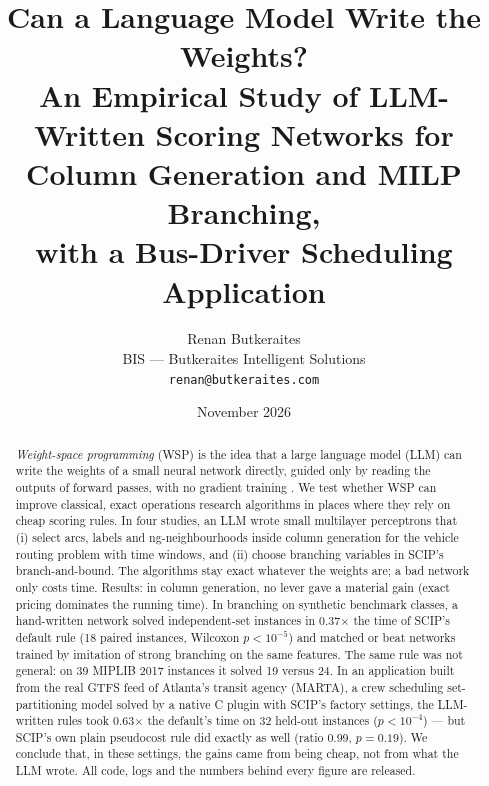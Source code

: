 \documentclass[11pt]{article}
\title{Can a Language Model Write the Weights?\\
\large An Empirical Study of LLM-Written Scoring Networks for Column Generation and MILP Branching,\\
with a Bus-Driver Scheduling Application}
\author{Renan Butkeraites\\
BIS --- Butkeraites Intelligent Solutions\\
\texttt{renan@butkeraites.com}}
\date{November 2026}
\begin{document}
\maketitle

\begin{abstract}
\emph{Weight-space programming} (WSP) is the idea that a large language model (LLM) can write the
weights of a small neural network directly, guided only by reading the outputs of forward passes,
with no gradient training \citep{wsp}. We test whether WSP can improve classical, exact operations
research algorithms in places where they rely on cheap scoring rules. In four studies, an LLM wrote
small multilayer perceptrons that (i) select arcs, labels and ng-neighbourhoods inside column
generation for the vehicle routing problem with time windows, and (ii) choose branching variables
in SCIP's branch-and-bound. The algorithms stay exact whatever the weights are; a bad network only
costs time. Results: in column generation, no lever gave a material gain (exact pricing dominates
the running time). In branching on synthetic benchmark classes, a hand-written network solved
independent-set instances in 0.37$\times$ the time of SCIP's default rule (18 paired instances,
Wilcoxon $p<10^{-5}$) and matched or beat networks trained by imitation of strong branching on the
same features. The same rule was not general: on 39 MIPLIB 2017 instances it solved 19 versus 24.
In an application built from the real GTFS feed of Atlanta's transit agency (MARTA), a crew
scheduling set-partitioning model solved by a native C plugin with SCIP's factory settings, the
LLM-written rules took 0.63$\times$ the default's time on 32 held-out instances ($p<10^{-4}$) ---
but SCIP's own plain pseudocost rule did exactly as well (ratio 0.99, $p=0.19$). We conclude that,
in these settings, the gains came from being cheap, not from what the LLM wrote. All code, logs
and the numbers behind every figure are released.
\end{abstract}
\end{document}
